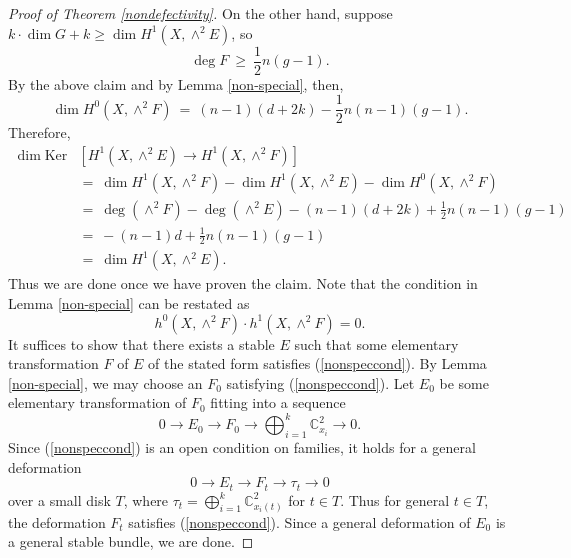 \documentclass[10pt]{amsart}
\numberwithin{equation}{section}
\newcommand{\cc}{\mathbb C}
\newcommand{\Ker}{\mathrm{Ker}}
\begin{document}
\begin{proof}[Proof of Theorem \ref{nondefectivity}]
On the other hand, suppose $k \cdot \dim G + k \ge \dim H^1(X, \wedge^2 E)$, so
\[ \deg F \ \ge \ \frac{1}{2}n(g-1). \]
 By the above claim and by Lemma \ref{non-special}, then,
\[
\dim H^0 (X, \wedge^2 F) \ =  \ (n-1)(d+2k) - \frac{1}{2} n(n-1)(g-1).
\]
Therefore,
\[
\begin{split}
\dim \Ker &\left[ H^1(X, \wedge^2 E) \longrightarrow  H^1(X, \wedge^2 F) \right] \\
&= \ \dim H^1(X, \wedge^2 F) - \dim H^1(X, \wedge^2 E) - \dim H^0(X, \wedge^2 F)\\
&= \ \deg (\wedge^2 F) - \deg (\wedge^2 E) - (n-1)(d+2k) + \frac{1}{2} n(n-1)(g-1)\\
&= \ -(n-1)d + \frac{1}{2} n(n-1)(g-1) \\
&= \ \dim H^1(X, \wedge^2 E).
\end{split}
\]
Thus we are done once we have proven the claim. Note that the condition in Lemma \ref{non-special} can be restated as
\begin{equation} h^0( X, \wedge^2 F) \cdot h^1 (X, \wedge^2F) = 0. \label{nonspeccond} \end{equation}
It suffices to show that there exists a stable $E$ such that some elementary transformation $F$ of $E$ of the stated form satisfies (\ref{nonspeccond}). By Lemma \ref{non-special}, we may choose an $F_0$ satisfying (\ref{nonspeccond}). Let $E_0$ be some elementary transformation of $F_0$ fitting into a sequence
\begin{equation} 0 \to E_0 \to F_0 \to \bigoplus_{i=1}^k \cc^2_{x_i} \to 0. \label{specialF} \end{equation}
Since (\ref{nonspeccond}) is an open condition on families, it holds for a general deformation
\[ 0 \to E_t \to F_t \to \tau_{t} \to 0 \]
over a small disk $T$, where $\tau_t = \bigoplus_{i=1}^k \cc^2_{x_i(t)}$ for $t \in T$. Thus for general $t \in T$, the deformation $F_t$ satisfies (\ref{nonspeccond}). Since a general deformation of $E_0$ is a general stable bundle, we are done.
%

\end{proof}
\end{document}
